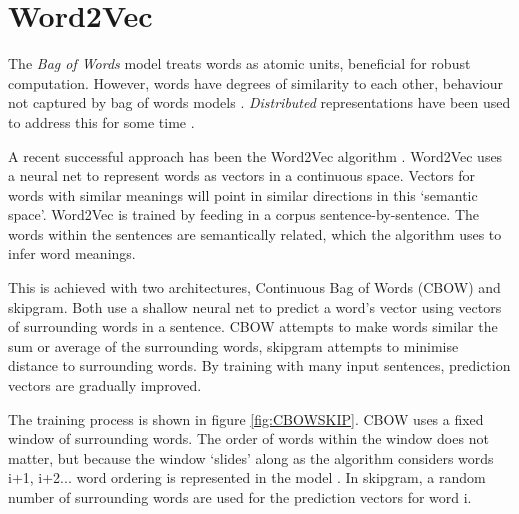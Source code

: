 \newpage
\vspace{-0.3cm}
\section{Word2Vec}
\label{sec:WORD2VEC}
\vspace{-0.3cm}

The \emph{Bag of Words} model treats words as atomic units, beneficial for robust computation. However, words have degrees of similarity to each other, behaviour not captured by bag of words models \cite{word2veckingqueen}. \emph{Distributed} representations have been used to address this for some time \cite{distributedrepresentations}.

 A recent successful approach has been the Word2Vec algorithm \cite{word2vec1}\cite{word2vec2}.  Word2Vec uses a neural net to represent words as vectors in a continuous space. Vectors for words with similar meanings will point in similar directions in this `semantic space'. Word2Vec is trained by feeding in a corpus sentence-by-sentence. The words within the sentences are semantically related, which the algorithm uses to infer word meanings. 
 
This is achieved with two architectures, Continuous Bag of Words (CBOW) and skipgram. Both use a shallow neural net to predict a word's vector using vectors of surrounding words in a sentence. CBOW attempts to make words similar the sum or average of the surrounding words, skipgram attempts to minimise distance to surrounding words. By training with many input sentences, prediction vectors are gradually improved.


The training process is shown in figure \ref{fig:CBOWSKIP}. CBOW uses a fixed window of surrounding words. The order of words within the window does not matter, but because the window `slides' along as the algorithm considers words i+1, i+2... word ordering is represented in the model . In skipgram, a random number of surrounding words are used for the prediction vectors for word i. 

